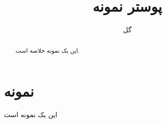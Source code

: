 \documentclass{../boostan/Boostan-Poster}
\title{پوستر نمونه}
\author{گل}
\begin{document}
\maketitle
\begin{abstract}
این یک نمونه خلاصه است.
\end{abstract}


\section{نمونه}

این یک نمونه است
\end{document}
